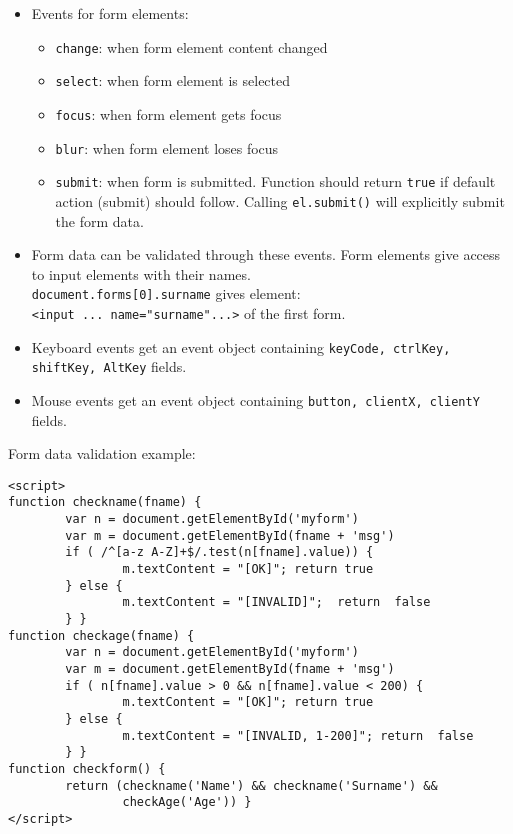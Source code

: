 \documentclass[trans,compress,xcolor=table]{beamer}
\begin{document}
\begin{frame}[fragile]
\begin{itemize}
\item Events for form elements:
\begin{itemize}
\item \lstinline!change!: when form element content changed
\item \lstinline!select!: when form element is selected
\item \lstinline!focus!: when form element gets focus
\item \lstinline!blur!: when form element loses focus
\item \lstinline!submit!: when form is submitted. Function
	should return \lstinline!true! if default action (submit)
	should follow. Calling \lstinline!el.submit()! will
	explicitly submit the form data.
\end{itemize}
\item Form data can be validated through these events. Form elements
	give access to input elements with their names.\\
	\lstinline!document.forms[0].surname! gives element:\\
	\lstinline!<input ... name="surname"...>! of the first form.
\item Keyboard events get an event object containing \lstinline!keyCode, ctrlKey, shiftKey, AltKey! fields.
\item Mouse events get an event object containing \lstinline!button, clientX, clientY! fields. 
\end{itemize}
\end{frame}

\begin{frame}[fragile]
Form data validation example:
\begin{lstlisting}
<script>
function checkname(fname) {
        var n = document.getElementById('myform')
        var m = document.getElementById(fname + 'msg')
        if ( /^[a-z A-Z]+$/.test(n[fname].value)) {   
                m.textContent = "[OK]"; return true
        } else {
                m.textContent = "[INVALID]";  return  false
        } }
function checkage(fname) {
        var n = document.getElementById('myform')
        var m = document.getElementById(fname + 'msg')
        if ( n[fname].value > 0 && n[fname].value < 200) {      
                m.textContent = "[OK]"; return true
        } else {
                m.textContent = "[INVALID, 1-200]"; return  false
        } }
function checkform() {
        return (checkname('Name') && checkname('Surname') && 
                checkAge('Age')) }
</script>
\end{lstlisting}
\end{frame}
\end{document}
